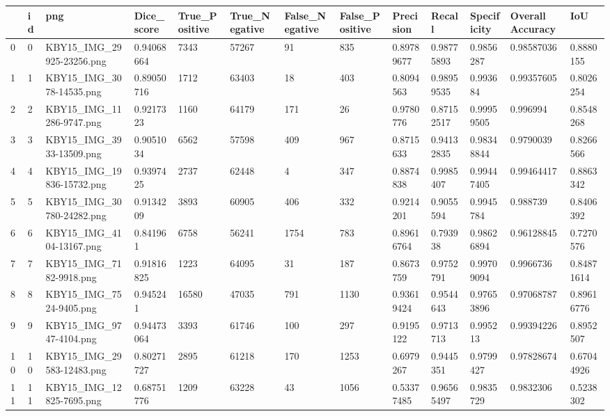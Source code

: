 \documentclass[11pt, a4paper, twoside]{report}
\begin{document}
\begin{longtable}[c]{@{}lllllllllllll@{}}
\toprule
 & id & png & Dice\_score & True\_Positive & True\_Negative & False\_Negative & False\_Positive & Precision & Recall & Specificity & Overall Accuracy & IoU \\* \midrule
\endhead
%
\bottomrule
\endfoot
%
\endlastfoot
%
0 & 0 & KBY15\_IMG\_29925-23256.png & 0.94068664 & 7343 & 57267 & 91 & 835 & 0.89789677 & 0.98775893 & 0.9856287 & 0.98587036 & 0.8880155 \\
1 & 1 & KBY15\_IMG\_3078-14535.png & 0.89050716 & 1712 & 63403 & 18 & 403 & 0.8094563 & 0.98959535 & 0.993684 & 0.99357605 & 0.8026254 \\
2 & 2 & KBY15\_IMG\_11286-9747.png & 0.9217323 & 1160 & 64179 & 171 & 26 & 0.9780776 & 0.87152517 & 0.99959505 & 0.996994 & 0.8548268 \\
3 & 3 & KBY15\_IMG\_3933-13509.png & 0.9051034 & 6562 & 57598 & 409 & 967 & 0.8715633 & 0.94132835 & 0.98348844 & 0.9790039 & 0.8266566 \\
4 & 4 & KBY15\_IMG\_19836-15732.png & 0.9397425 & 2737 & 62448 & 4 & 347 & 0.8874838 & 0.9985407 & 0.99447405 & 0.99464417 & 0.8863342 \\
5 & 5 & KBY15\_IMG\_30780-24282.png & 0.9134209 & 3893 & 60905 & 406 & 332 & 0.9214201 & 0.9055594 & 0.9945784 & 0.988739 & 0.8406392 \\
6 & 6 & KBY15\_IMG\_4104-13167.png & 0.841961 & 6758 & 56241 & 1754 & 783 & 0.89616764 & 0.793938 & 0.98626894 & 0.96128845 & 0.7270576 \\
7 & 7 & KBY15\_IMG\_7182-9918.png & 0.91816825 & 1223 & 64095 & 31 & 187 & 0.8673759 & 0.9752791 & 0.99709094 & 0.9966736 & 0.84871614 \\
8 & 8 & KBY15\_IMG\_7524-9405.png & 0.945241 & 16580 & 47035 & 791 & 1130 & 0.93619424 & 0.9544643 & 0.97653896 & 0.97068787 & 0.89616776 \\
9 & 9 & KBY15\_IMG\_9747-4104.png & 0.94473064 & 3393 & 61746 & 100 & 297 & 0.9195122 & 0.9713713 & 0.995213 & 0.99394226 & 0.8952507 \\
10 & 10 & KBY15\_IMG\_29583-12483.png & 0.80271727 & 2895 & 61218 & 170 & 1253 & 0.6979267 & 0.9445351 & 0.9799427 & 0.97828674 & 0.67044926 \\
11 & 11 & KBY15\_IMG\_12825-7695.png & 0.68751776 & 1209 & 63228 & 43 & 1056 & 0.53377485 & 0.96565497 & 0.9835729 & 0.9832306 & 0.5238302 \\

\end{longtable}
\end{document}
